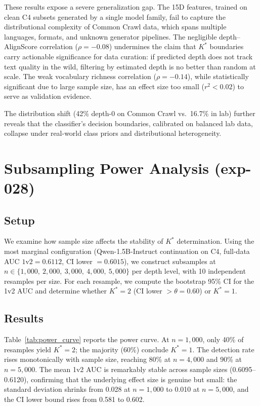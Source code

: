 \documentclass[11pt,a4paper]{article}
\begin{document}
These results expose a severe generalization gap.
The 15D features, trained on clean C4 subsets generated by a single model family, fail to capture the distributional complexity of Common Crawl data, which spans multiple languages, formats, and unknown generator pipelines.
The negligible depth--AlignScore correlation ($\rho = -0.08$) undermines the claim that $K^*$ boundaries carry actionable significance for data curation: if predicted depth does not track text quality in the wild, filtering by estimated depth is no better than random at scale.
The weak vocabulary richness correlation ($\rho = -0.14$), while statistically significant due to large sample size, has an effect size too small ($r^2 < 0.02$) to serve as validation evidence.

The distribution shift (42\% depth-0 on Common Crawl vs.\ 16.7\% in lab) further reveals that the classifier's decision boundaries, calibrated on balanced lab data, collapse under real-world class priors and distributional heterogeneity.


\section{Subsampling Power Analysis (exp-028)}

\subsection{Setup}

We examine how sample size affects the stability of $K^*$ determination.
Using the most marginal configuration (Qwen-1.5B-Instruct continuation on C4, full-data AUC $1\text{v}2 = 0.6112$, CI lower $= 0.6015$), we construct subsamples at $n \in \{1{,}000,\ 2{,}000,\ 3{,}000,\ 4{,}000,\ 5{,}000\}$ per depth level, with 10 independent resamples per size.
For each resample, we compute the bootstrap 95\% CI for the 1v2 AUC and determine whether $K^* = 2$ (CI lower $> \theta = 0.60$) or $K^* = 1$.

\subsection{Results}

Table~\ref{tab:power_curve} reports the power curve.
At $n = 1{,}000$, only 40\% of resamples yield $K^* = 2$; the majority (60\%) conclude $K^* = 1$.
The detection rate rises monotonically with sample size, reaching 80\% at $n = 4{,}000$ and 90\% at $n = 5{,}000$.
The mean 1v2 AUC is remarkably stable across sample sizes (0.6095--0.6120), confirming that the underlying effect size is genuine but small: the standard deviation shrinks from 0.028 at $n = 1{,}000$ to 0.010 at $n = 5{,}000$, and the CI lower bound rises from 0.581 to 0.602.
\end{document}
